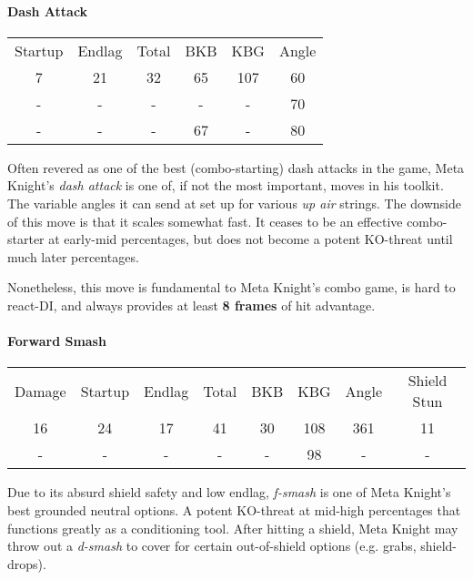 \paragraph{Dash Attack}
\begin{center}
	\begin{tabular}{| c  c  c | c  c  c |}
		\hline
		Startup	& Endlag & Total & BKB & KBG & Angle \\
		7	&	21	&	32	&	65	&	107 & 	60\deg \\
		-	&	-	&	-	&	- 	& 	- 	&	70\deg	\\
		-	&	-	&	-	&	67	&	-	&	80\deg	\\
		\hline
	\end{tabular}
\end{center}
Often revered as one of the best (combo-starting) dash attacks in the game, %
 Meta Knight's \emph{dash attack} is one of, if not the most important, moves in his toolkit. The variable angles it can send at set up for various \textit{up air} strings. The downside of this move is that it scales somewhat fast. It ceases to be an effective combo-starter at early-mid percentages, but does not become a potent KO-threat until much later percentages.

Nonetheless, this move is fundamental to Meta Knight's combo game, is hard to react-DI, and always provides at least \textbf{8 frames} of hit advantage.

\paragraph{Forward Smash}
\begin{center}
	\begin{tabular}{| c | c  c  c | c  c  c | c |}
		\hline
		Damage 	&	Startup	& Endlag & Total & BKB 	& KBG 	& 	Angle 	&	Shield Stun	\\
		16		&	24		&	17	&	41	&	30	&	108 & 	361\deg	&	11 		\\
		-		&	-		&	-	&	-	&	- 	& 	98 	&	-		&	-		\\
		\hline
	\end{tabular}
\end{center}
Due to its absurd shield safety and low endlag, \textit{f-smash} is one of Meta Knight's best grounded neutral options. A potent KO-threat at mid-high percentages that functions greatly as a conditioning tool. After hitting a shield, Meta Knight may throw out a \textit{d-smash} to cover for certain out-of-shield options (e.g. grabs, shield-drops).

